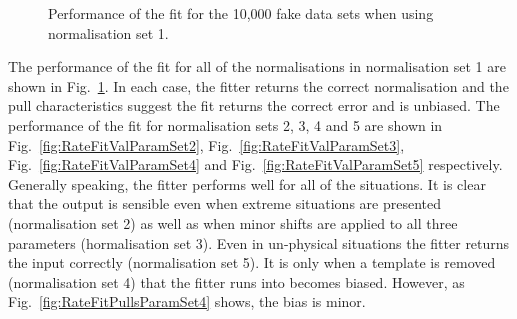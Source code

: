 \begin{figure}%
  \centering
  \caption{Performance of the fit for the 10,000 fake data sets when using normalisation set 1.}
  \label{fig:RateFitValParamSet1}
\end{figure}
The performance of the fit for all of the normalisations in normalisation set 1 are shown in Fig.~\ref{fig:RateFitValParamSet1}.  In each case, the fitter returns the correct normalisation and the pull characteristics suggest the fit returns the correct error and is unbiased.  The performance of the fit for normalisation sets 2, 3, 4 and 5 are shown in Fig.~\ref{fig:RateFitValParamSet2}, Fig.~\ref{fig:RateFitValParamSet3}, Fig.~\ref{fig:RateFitValParamSet4} and Fig.~\ref{fig:RateFitValParamSet5} respectively.  Generally speaking, the fitter performs well for all of the situations.  It is clear that the output is sensible even when extreme situations are presented (normalisation set 2) as well as when minor shifts are applied to all three parameters (hormalisation set 3).  Even in un-physical situations the fitter returns the input correctly (normalisation set 5).  It is only when a template is removed (normalisation set 4) that the fitter runs into becomes biased.  However, as Fig.~\ref{fig:RateFitPullsParamSet4} shows, the bias is minor.
